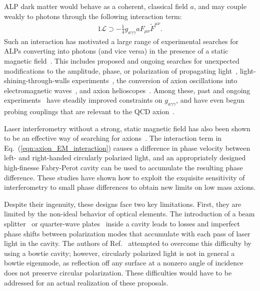 \documentclass[aps,prd,nofootinbib,twocolumn,superscriptaddress,preprintnumbers,letterpaper, longbibliography]{revtex4-1}
\def\Ref{Ref.~}
\begin{document}
ALP dark matter would behave as a coherent, classical field $a$, and may couple weakly to photons through the following interaction term: 
%
\begin{alignat}{1}
    \mathcal{L} \supset -\frac{1}{4} g_{a\gamma\gamma} a F_{\mu\nu} \tilde{F}^{\mu\nu}.
    \label{eqn:axion_EM_interaction}
\end{alignat}
%
Such an interaction has motivated a large range of experimental searches for ALPs converting into photons (and vice versa) in the presence of a static magnetic field~\cite{Sikivie:1983ip,Wilczek:1987mv}. This includes proposed and ongoing searches for unexpected modifications to the amplitude, phase, or polarization of propagating light~\cite{Cameron:1993mr,Tam:2011kw,DellaValle:2015xxa}, light-shining-through-walls experiments~\cite{Chou:2007zzc,Robilliard:2007bq,Ehret:2010mh,Betz:2013dza,Ballou:2014myz,Ballou:2015cka}, the conversion of axion oscillations into electromagnetic waves~\cite{Horns:2012jf,Chaudhuri:2014dla,Kahn:2016aff,TheMADMAXWorkingGroup:2016hpc,Foster:2017hbq,Chaudhuri:2018rqn,Du:2018uak,Baryakhtar:2018doz,Ouellet:2018beu,Ouellet:2019tlz}, and axion helioscopes~\cite{Anastassopoulos:2017ftl,Armengaud:2014gea}. Among these, past and ongoing experiments~\cite{Cameron:1993mr,DellaValle:2015xxa,Chou:2007zzc,Robilliard:2007bq,Ehret:2010mh,Betz:2013dza,Ballou:2014myz,Ballou:2015cka,Horns:2012jf,Du:2018uak,Ouellet:2018beu,Anastassopoulos:2017ftl} have steadily improved constraints on $g_{a\gamma\gamma}$, and have even begun probing couplings that are relevant to the QCD axion~\cite{Du:2018uak}. 

Laser interferometry without a strong, static magnetic field has also been shown to be an effective way of searching for axions~\cite{Melissinos:2008vn,DeRocco:2018jwe,Obata:2018vvr}. The interaction term in Eq.~(\ref{eqn:axion_EM_interaction}) causes a difference in phase velocity between left- and right-handed circularly polarized light, and an appropriately designed high-finesse Fabry-Perot cavity can be used to accumulate the resulting phase difference. These studies have shown how to exploit the exquisite sensitivity of interferometry to small phase differences to obtain new limits on low mass axions.

Despite their ingenuity, these designs face two key limitations. First, they are limited by the non-ideal behavior of optical elements. The introduction of a beam splitter~\cite{Melissinos:2008vn} or quarter-wave plates~\cite{DeRocco:2018jwe} inside a cavity leads to losses and imperfect phase shifts between polarization modes that accumulate with each pass of laser light in the cavity. The authors of \Ref\cite{Obata:2018vvr} attempted to overcome this difficulty by using a bowtie cavity; however, circularly polarized light is not in general a bowtie eigenmode, as reflection off any surface at a nonzero angle of incidence does not preserve circular polarization. These difficulties would have to be addressed for an actual realization of these proposals.
\end{document}
